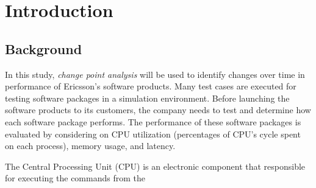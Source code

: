 
\lhead[\chaptername~\thechapter]{\rightmark}

\rhead[\leftmark]{}

\lfoot[\thepage]{}

\cfoot{}

\rfoot[]{\thepage}

\chapter{Introduction}

\section{Background \label{sec:Background}}

In this study, \emph{change point analysis} will be used to identify
changes over time in performance of Ericsson's software products.
Many test cases are executed for testing software packages in a simulation
environment. Before launching the software products to its customers,
the company needs to test and determine how each software package
performs. The performance of these software packages is evaluated
by considering on CPU utilization (percentages of CPU's cycle spent
on each process), memory usage, and latency. 

The Central Processing Unit (CPU) is an electronic component that
responsible for executing the commands from the 

